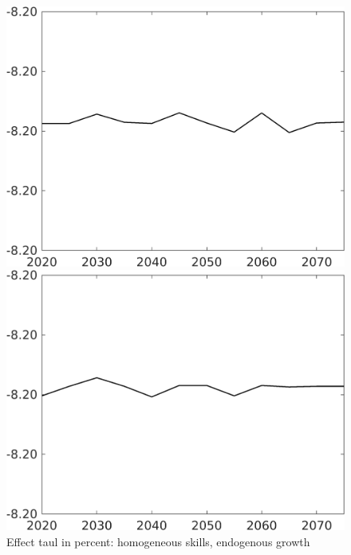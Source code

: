 \documentclass[12pt]{article}
\begin{document}
\begin{figure}[h!!]
	\centering
	\caption{Effect taul in percent: homogeneous skills, endogenous growth}\label{fig:LF_BAU_nsk1_xgr03}
	\begin{minipage}[]{0.32\textwidth}
		\includegraphics[width=1\textwidth]{../../codding_model/own_basedOnFried/optimalPol_010922_revision/figures/all_13Sept22/CompTaul_LFBAUPer_Reg0_Lf_spillover0_nsk1_xgr0_knspil0_sep1_countec0_GovRev0_etaa0.79.png}
	\end{minipage}	
	\begin{minipage}[]{0.32\textwidth}
		\includegraphics[width=1\textwidth]{../../codding_model/own_basedOnFried/optimalPol_010922_revision/figures/all_13Sept22/CompTaul_LFBAUPer_Reg0_Lg_spillover0_nsk1_xgr0_knspil0_sep1_countec0_GovRev0_etaa0.79.png}

\end{minipage}
\end{figure}
\end{document}
